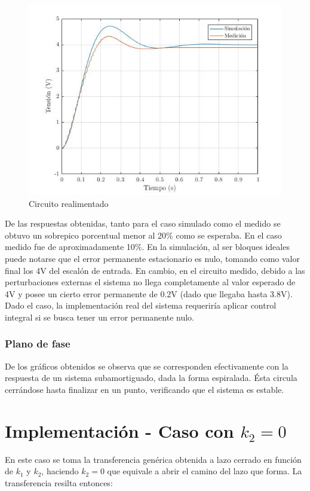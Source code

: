 \documentclass{article}
\begin{document}
\begin{figure}[H]
\centering
\includegraphics[width=0.7\linewidth]{../graficos/escalon1.jpg}
\caption{Circuito realimentado}
\label{fig:escalonNormal}
\end{figure}

De las respuestas obtenidas, tanto para el caso simulado como el medido se obtuvo un sobrepico porcentual menor al 20\% como se esperaba. En el caso medido fue de aproximadamente 10\%.
En la simulación, al ser bloques ideales puede notarse que el error permanente estacionario es nulo, tomando como valor final los 4V del escalón de entrada. En cambio, en el circuito medido, debido a las perturbaciones externas el sistema no llega completamente al valor esperado de 4V y posee un cierto error permanente de 0.2V (dado que llegaba hasta 3.8V). Dado el caso, la implementación real del sistema requeriría aplicar control integral si se busca tener un error permanente nulo.

\subsubsection{Plano de fase}


De los gráficos obtenidos se observa que se corresponden efectivamente con la respuesta de un sistema subamortiguado, dada la forma espiralada. Ésta circula cerrándose hasta finalizar en un punto, verificando que el sistema es estable.

\section{Implementación - Caso con $k_2 = 0$}

En este caso se toma la transferencia genérica obtenida a lazo cerrado en función de $k_1$ y $k_2$, haciendo $k_2 = 0$ que equivale a abrir el camino del lazo que forma. La transferencia resilta entonces:
\end{document}

